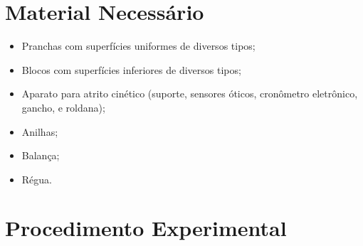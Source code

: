 \section{Material Necessário}

\begin{itemize}
	\item Pranchas com superfícies uniformes de diversos tipos;
	\item Blocos com superfícies inferiores de diversos tipos;
	\item Aparato para atrito cinético (suporte, sensores óticos, cronômetro eletrônico, gancho, e roldana);
	\item Anilhas;
	\item Balança;
	\item Régua.
\end{itemize}

\section{Procedimento Experimental}

